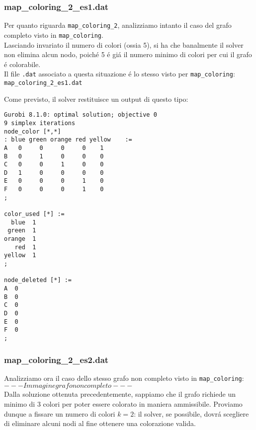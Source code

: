 \documentclass{article}
\begin{document}
\subsubsection{map\_coloring\_2\_es1.dat}
Per quanto riguarda \texttt{map\_coloring\_2}, analizziamo intanto il caso del grafo completo visto in \texttt{map\_coloring}.\\
Lasciando invariato il numero di colori (ossia 5), si ha che banalmente il solver non elimina alcun nodo, poich\'e 5 \'e gi\'a il numero  minimo di colori per cui il grafo \'e colorabile.\\
Il file \texttt{.dat} associato a questa situazione \'e lo stesso visto per \texttt{map\_coloring}:\\

\texttt{map\_coloring\_2\_es1.dat}


Come previsto, il solver restituisce un output di questo tipo:\\

\begin{verbatim}
Gurobi 8.1.0: optimal solution; objective 0
9 simplex iterations
node_color [*,*]
: blue green orange red yellow    :=
A   0     0     0     0    1
B   0     1     0     0    0
C   0     0     1     0    0
D   1     0     0     0    0
E   0     0     0     1    0
F   0     0     0     1    0
;

color_used [*] :=
  blue  1
 green  1
orange  1
   red  1
yellow  1
;

node_deleted [*] :=
A  0
B  0
C  0
D  0
E  0
F  0
;

\end{verbatim}

\subsubsection{map\_coloring\_2\_es2.dat}
Analizziamo ora il caso dello stesso grafo non completo visto in \texttt{map\_coloring}:\\

$ --- Immagine grafo non completo --- $\\

Dalla soluzione ottenuta precedentemente, sappiamo che il grafo richiede un minimo di 3 colori per poter essere colorato in maniera ammissibile. Proviamo dunque a fissare un numero di colori $k = 2$: il solver, se possibile, dovr\'a scegliere di eliminare alcuni nodi al fine ottenere una colorazione valida.\\
\end{document}
